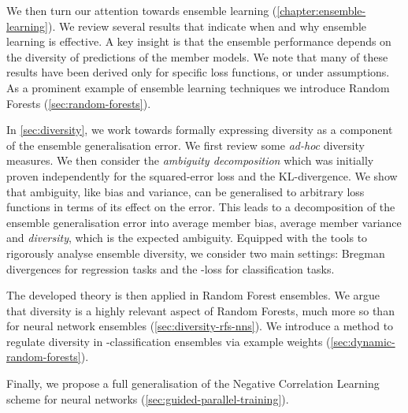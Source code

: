 \documentclass[
	twoside=false, %
]{kaobook}
\begin{document}
We then turn our attention towards ensemble learning (\cf \cref{chapter:ensemble-learning}). We review several results that indicate when and why ensemble learning is effective. A key insight is that the ensemble performance depends on the diversity of predictions of the member models. We note that many of these results have been derived only for specific loss functions, or under assumptions. As a prominent example of ensemble learning techniques we introduce Random Forests (\cf \cref{sec:random-forests}).

In \cref{sec:diversity}, we work towards formally expressing diversity as a component of the ensemble generalisation error. We first review some \textit{ad-hoc} diversity measures. We then consider the \textit{ambiguity decomposition} which was initially proven independently for the squared-error loss and the KL-divergence. We show that ambiguity, like bias and variance, can be generalised to arbitrary loss functions in terms of its effect on the error. This leads to a decomposition of the ensemble generalisation error into average member bias, average member variance and \textit{diversity}, which is the expected ambiguity. Equipped with the tools to rigorously analyse ensemble diversity, we consider two main settings: Bregman divergences for regression tasks and the \zeroone-loss for classification tasks. 

The developed theory is then applied in Random Forest ensembles. We argue that diversity is a highly relevant aspect of Random Forests, much more so than for neural network ensembles (\cf \cref{sec:diversity-rfs-nns}). We introduce a method to regulate diversity in \zeroone-classification ensembles via example weights (\cf \cref{sec:dynamic-random-forests}).

Finally, we propose a full generalisation of the Negative Correlation Learning scheme for neural networks (\cf \cref{sec:guided-parallel-training}).










\end{document}

